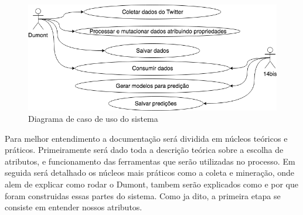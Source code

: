 \begin{figure}
    \centering
    \includegraphics[width=.8\textwidth]{imagens/tcc_caso_de_uso.png}
    \caption{Diagrama de caso de uso do sistema}
    \label{fig:tcc_caso_de_uso}
\end{figure}

Para melhor entendimento a documentação será dividida em núcleos teóricos e práticos. Primeiramente será dado toda a descrição teórica sobre a escolha de atributos, e funcionamento das ferramentas que serão utilizadas no processo. Em seguida será detalhado os núcleos mais práticos como a coleta e mineração, onde alem de explicar como rodar o Dumont, tambem serão explicados como e por que foram construidas essas partes do sistema. Como ja dito, a primeira etapa se consiste em entender nossos atributos.




